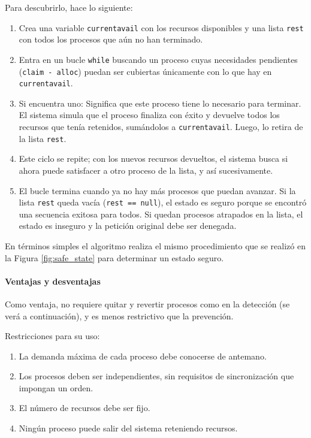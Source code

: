 Para descubrirlo, hace lo siguiente:
\begin{enumerate}
  \item Crea una variable \texttt{currentavail} con los recursos disponibles y una lista \texttt{rest} con todos los procesos que aún no han terminado.
  \item Entra en un bucle \texttt{while} buscando un proceso cuyas necesidades pendientes (\texttt{claim - alloc}) puedan ser cubiertas únicamente con lo que hay en \texttt{currentavail}.
  \item Si encuentra uno: Significa que este proceso tiene lo necesario para terminar. El sistema simula que el proceso finaliza con éxito y devuelve todos los recursos que tenía retenidos, sumándolos a \texttt{currentavail}. Luego, lo retira de la lista \texttt{rest}.
  \item Este ciclo se repite; con los nuevos recursos devueltos, el sistema busca si ahora puede satisfacer a otro proceso de la lista, y así sucesivamente.
  \item El bucle termina cuando ya no hay más procesos que puedan avanzar. Si la lista \texttt{rest} queda vacía (\texttt{rest == null}), el estado es seguro porque se encontró una secuencia exitosa para todos. Si quedan procesos atrapados en la lista, el estado es inseguro y la petición original debe ser denegada.
\end{enumerate}

En términos simples el algoritmo realiza el mismo procedimiento que se realizó en la Figura \ref{fig:safe_state} para determinar un estado seguro. 

\paragraph{Ventajas y desventajas}
Como ventaja, no requiere quitar y revertir procesos como en la detección (se verá a continuación), y es menos restrictivo que la prevención.

Restricciones para su uso:
\begin{enumerate}
  \item La demanda máxima de cada proceso debe conocerse de antemano.
  \item Los procesos deben ser independientes, sin requisitos de sincronización que impongan un orden.
  \item El número de recursos debe ser fijo.
  \item Ningún proceso puede salir del sistema reteniendo recursos.
\end{enumerate}

